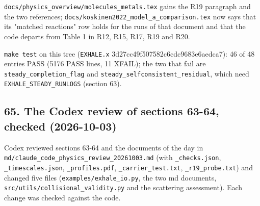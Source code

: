 \documentclass[english,a4paper]{my_memo}
\begin{document}
\texttt{docs/physics\_overview/molecules\_metals.tex} gains the R19 paragraph and
the two references; \texttt{docs/koskinen2022\_model\_a\_comparison.tex} now says
that its "matched reactions" row holds for the runs of that document and
that the code departs from Table 1 in R12, R15, R17, R19 and R20.

\texttt{make\ test} on this tree (\texttt{EXHALE.x} 3d27cc49f507582c6cdc9683e6aedca7): 46 of
48 entries PASS (5176 PASS lines, 11 XFAIL); the two that fail are
\texttt{steady\_completion\_flag} and \texttt{steady\_selfconsistent\_residual}, which need
\texttt{EXHALE\_STEADY\_RUNLOGS} (section 63).

\subsection{65. The Codex review of sections 63-64, checked (2026-10-03)}\label{65-the-codex-review-of-sections-63-64-checked-2026-10-03}

Codex reviewed sections 63-64 and the documents of the day in
\texttt{md/claude\_code\_physics\_review\_20261003.md} (with \texttt{\_checks.json},
\texttt{\_timescales.json}, \texttt{\_profiles.pdf}, \texttt{\_carrier\_test.txt}, \texttt{\_r19\_probe.txt})
and changed five files (\texttt{examples/exhale\_io.py}, the two md documents,
\texttt{src/utils/collisional\_validity.py} and the scattering assessment). Each
change was checked against the code.
\end{document}
